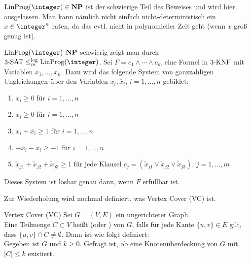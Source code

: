 \begin{Beweis}
    $\LinProg(\integer) \in \NP$ ist der schwierige Teil des Beweises und wird hier ausgelassen.
    Man kann nämlich nicht einfach nicht-deterministisch ein $x \in \integer^n$ raten,
    da das evtl. nicht in polynomieller Zeit geht (wenn $x$ groß genug ist).
    
    $\LinProg(\integer)$ $\mathbf{NP}$-schwierig zeigt man durch
    $\kSAT{3} \le_m^{\log} \LinProg(\integer)$.
    Sei $F = c_1 \land \dotsb \land c_m$ eine Formel in $3\text{-}\text{KNF}$ mit
    Variablen $x_1, \dotsc, x_n$.
    Dazu wird das folgende System von ganzzahligen Ungleichungen über den Variablen
    $x_i, \overline{x}_i$, $i = 1, \dotsc, n$ gebildet:
    \begin{enumerate}
        \item
        $x_i \ge 0$ für $i = 1, \dotsc, n$
        
        \item
        $\overline{x_i} \ge 0$ für $i = 1, \dotsc, n$
        
        \item
        $x_i + \overline{x_i} \ge 1$ für $i = 1, \dotsc, n$
        
        \item
        $-x_i - \overline{x_i} \ge -1$ für $i = 1, \dotsc, n$
        
        \item
        $\widetilde{x}_{j1} + \widetilde{x}_{j2} + \widetilde{x}_{j3} \ge 1$
        für jede Klausel
        $c_j = (\widetilde{x}_{j1} \lor \widetilde{x}_{j2} \lor \widetilde{x}_{j3})$,
        $j = 1, \dotsc, m$
    \end{enumerate}
    Dieses System ist lösbar genau dann, wenn $F$ erfüllbar ist.
\end{Beweis}

\linie
\pagebreak

\begin{Bem}
    Zur Wiederholung wird nochmal definiert, was Vertex Cover (VC) ist.
\end{Bem}

\begin{Def}{Vertex Cover (VC)}
    Sei $G = (V, E)$ ein ungerichteter Graph.\\
    Eine Teilmenge $C \subset V$ heißt  (oder ) von $G$,
    falls für jede Kante $\{u, v\} \in E$ gilt, dass $\{u, v\} \cap C \not= \emptyset$.
    Dann ist  wie folgt definiert:\\
    Gegeben ist $G$ und $k \ge 0$.
    Gefragt ist, ob eine Knotenüberdeckung von $G$ mit $|C| \le k$ existiert.
\end{Def}

